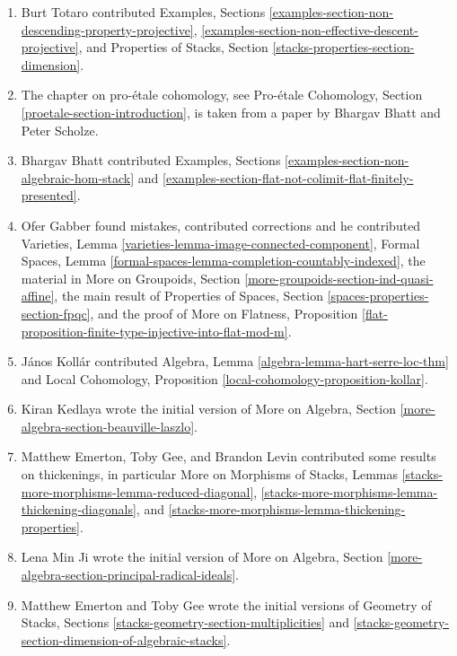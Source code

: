 \begin{enumerate}
and was the originator for the material in
More on Groupoids in Spaces, Sections
\ref{spaces-more-groupoids-section-finite} and
\ref{spaces-more-groupoids-section-etale-localize}.
\item Burt Totaro contributed Examples, Sections
\ref{examples-section-non-descending-property-projective},
\ref{examples-section-non-effective-descent-projective},
and
Properties of Stacks, Section \ref{stacks-properties-section-dimension}.
\item The chapter on pro-\'etale cohomology, see
Pro-\'etale Cohomology, Section \ref{proetale-section-introduction},
is taken from a paper by Bhargav Bhatt and Peter Scholze.
\item Bhargav Bhatt contributed Examples, Sections
\ref{examples-section-non-algebraic-hom-stack} and
\ref{examples-section-flat-not-colimit-flat-finitely-presented}.
\item Ofer Gabber found mistakes, contributed corrections and he
contributed
Varieties, Lemma \ref{varieties-lemma-image-connected-component},
Formal Spaces, Lemma \ref{formal-spaces-lemma-completion-countably-indexed},
the material in
More on Groupoids, Section \ref{more-groupoids-section-ind-quasi-affine},
the main result of
Properties of Spaces, Section \ref{spaces-properties-section-fpqc},
and the proof of
More on Flatness, Proposition
\ref{flat-proposition-finite-type-injective-into-flat-mod-m}.
\item J\'anos Koll\'ar contributed
Algebra, Lemma \ref{algebra-lemma-hart-serre-loc-thm} and
Local Cohomology, Proposition \ref{local-cohomology-proposition-kollar}.
\item Kiran Kedlaya wrote the initial version of
More on Algebra, Section \ref{more-algebra-section-beauville-laszlo}.
\item Matthew Emerton, Toby Gee, and Brandon Levin contributed
some results on thickenings, in particular
More on Morphisms of Stacks, Lemmas
\ref{stacks-more-morphisms-lemma-reduced-diagonal},
\ref{stacks-more-morphisms-lemma-thickening-diagonals}, and
\ref{stacks-more-morphisms-lemma-thickening-properties}.
\item Lena Min Ji wrote the initial version of
More on Algebra, Section \ref{more-algebra-section-principal-radical-ideals}.
\item Matthew Emerton and Toby Gee wrote the initial versions of
Geometry of Stacks,
Sections \ref{stacks-geometry-section-multiplicities} and
\ref{stacks-geometry-section-dimension-of-algebraic-stacks}.
\end{enumerate}



